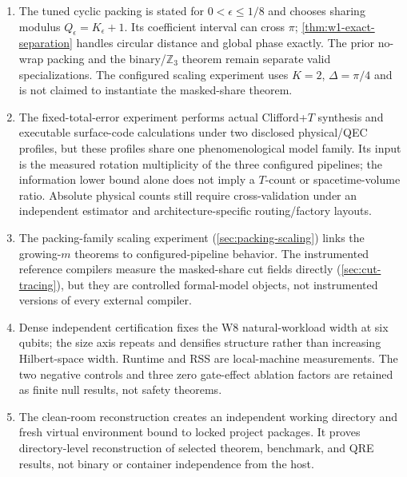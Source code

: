\documentclass[a4paper,twocolumn,10pt,unpublished]{quantumarticle}
\begin{document}
\begin{enumerate}[leftmargin=1.5em]
    $(s,a)\mapsto(-s,-a)$ degeneracy (\cref{rem:self-id-scope}).  Both
    clauses are measured only on the instrumented device of
    \cref{fig:commit-toll}; the two preregistered attempts to observe
    the toll at a third-party compiler boundary failed and are reported
    as failures.
    \item The tuned cyclic packing is stated for
    $0<\epsilon\leq1/8$ and chooses sharing modulus
    $Q_\epsilon=K_\epsilon+1$.  Its coefficient interval can cross $\pi$;
    \cref{thm:w1-exact-separation} handles circular distance and global
    phase exactly.  The prior no-wrap packing and the binary/$\mathbb Z_3$
    theorem remain separate valid specializations.
    The configured scaling experiment uses $K=2$, $\Delta=\pi/4$ and is not
    claimed to instantiate the masked-share theorem.
    \item The fixed-total-error experiment performs actual Clifford+$T$
    synthesis and executable surface-code calculations under two disclosed
    physical/QEC profiles, but these profiles share one phenomenological model
    family.  Its input is the measured rotation multiplicity of the three
    configured pipelines; the information lower bound alone does not imply a
    $T$-count or spacetime-volume ratio.  Absolute physical counts still require
    cross-validation under an independent estimator and architecture-specific
    routing/factory layouts.
    \item The packing-family scaling experiment
    (\cref{sec:packing-scaling}) links the growing-$m$ theorems to
    configured-pipeline behavior.  The instrumented reference compilers measure
    the masked-share cut fields directly (\cref{sec:cut-tracing}), but they are
    controlled formal-model objects, not instrumented versions of every
    external compiler.
    \item Dense independent certification fixes the W8 natural-workload width
    at six qubits; the size axis repeats and densifies structure rather than
    increasing Hilbert-space width.  Runtime and RSS are local-machine
    measurements.  The two negative controls and three zero gate-effect
    ablation factors are retained as finite null results, not safety theorems.
    \item The clean-room reconstruction creates an independent working
    directory and fresh virtual environment bound to locked project packages.
    It proves directory-level reconstruction of selected theorem, benchmark,
    and QRE results, not binary or container independence from the host.
\end{enumerate}
\end{document}
